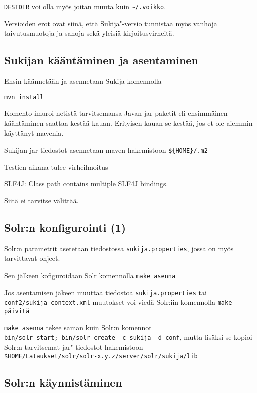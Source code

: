 \documentclass[12pt,a4paper]{scrartcl}
\begin{document}
\verb|DESTDIR| voi olla myös joitan muuta kuin \verb|~/.voikko|.

Versioiden erot ovat siinä, että Sukija"-versio tunnistaa myös vanhoja
taivutusmuotoja ja sanoja sekä yleisiä kirjoitusvirheitä.



\subsection*{Sukijan kääntäminen ja asentaminen}

Ensin käännetään ja asennetaan Sukija komennolla

\verb=mvn install=

Komento imuroi netistä tarvitsemansa Javan jar-paketit eli ensimmäinen
kääntäminen saattaa kestää kauan. Erityisen kauan se kestää, jos et
ole aiemmin käyttänyt mavenia.

Sukijan jar-tiedostot asennetaan maven-hakemistoon \verb|${HOME}/.m2|

Testien aikana tulee virheilmoitus

SLF4J: Class path contains multiple SLF4J bindings.

Siitä ei tarvitse välittää.


\subsection*{Solr:n konfigurointi (1)}

Solr:n parametrit asetetaan tiedostossa \verb|sukija.properties|,
jossa on myös tarvittavat ohjeet.

Sen jälkeen kofiguroidaan Solr komennolla \verb|make asenna|

Jos asentamisen jäkeen muuttaa tiedostoa
\verb|sukija.properties| tai \\
\verb|conf2/sukija-context.xml|
muutokset voi viedä Solr:iin komennolla \verb|make päivitä|

\verb=make asenna= tekee saman kuin Solr:n komennot \\
\verb=bin/solr start; bin/solr create -c sukija -d conf=, mutta lisäksi se
kopioi Solr:n tarvitsemat jar"-tiedostot hakemistoon \\
\verb=$HOME/Lataukset/solr/solr-x.y.z/server/solr/sukija/lib=


\subsection*{Solr:n käynnistäminen}
\end{document}
